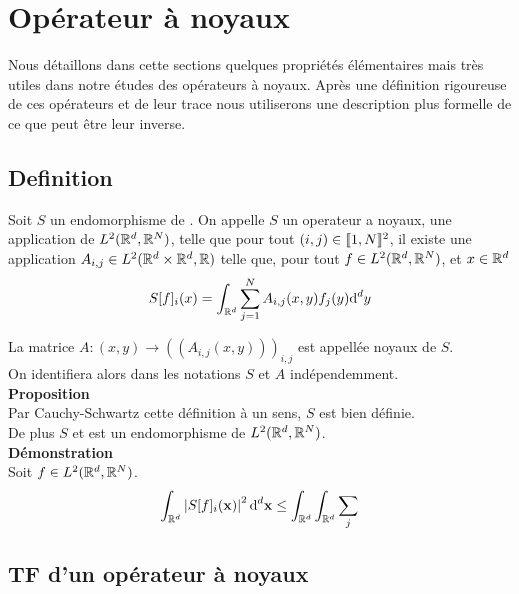 \documentclass[10pt]{article}
\begin{document}
\pagebreak

\section{Opérateur à noyaux}

Nous détaillons dans cette sections quelques propriétés élémentaires mais très utiles dans notre études des opérateurs à noyaux. Après une définition rigoureuse de ces opérateurs et de leur trace nous utiliserons une description plus formelle de ce que peut être leur inverse.\\



\subsection{Definition}

Soit $S$ un endomorphisme de . On appelle $S$ un operateur a noyaux, une application de $L^2(\mathbb{R}^d, \mathbb{R}^N)$, telle que pour tout $(i,j) \in  \llbracket 1,N \rrbracket ^2$, il existe une application $A_{i,j} \in L^2(\mathbb{R}^d\times\mathbb{R}^d, \mathbb{R})$ telle que,  pour tout $f \in L^2(\mathbb{R}^d, \mathbb{R}^N)$, et $x \in \mathbb{R}^d$ 
 \begin{equation}
  S[f]_i(x) = \int_{\mathbb{R}^d} \sum_{j=1}^{N} A_{i,j}(x,y)f_j(y) \text{d}^d y
 \end{equation}

 La matrice $A : (x,y) \rightarrow ((A_{i,j}(x,y)))_{i,j}$ est appellée noyaux de $S$. \\
 On identifiera alors dans les notations $S$ et $A$ indépendemment. \\

\textbf{Proposition}\\
Par Cauchy-Schwartz cette définition à un sens, $S$ est bien définie. \\
De plus $S$ et est un endomorphisme de $L^2(\mathbb{R}^d, \mathbb{R}^N)$. \\

\textbf{Démonstration}\\
Soit $f\in L^2(\mathbb{R}^d, \mathbb{R}^N)$.\\

\begin{equation}
   \int_{\mathbb{R}^d} \left| S[f]_i ({\bf x}) \right|^{2} \text{d}^d {\bf x} \le \int_{\mathbb{R}^d} \int_{\mathbb{R}^d} \sum_j 
\end{equation}


\vspace*{11pt}

\subsection{TF d'un opérateur à noyaux}
\end{document}
